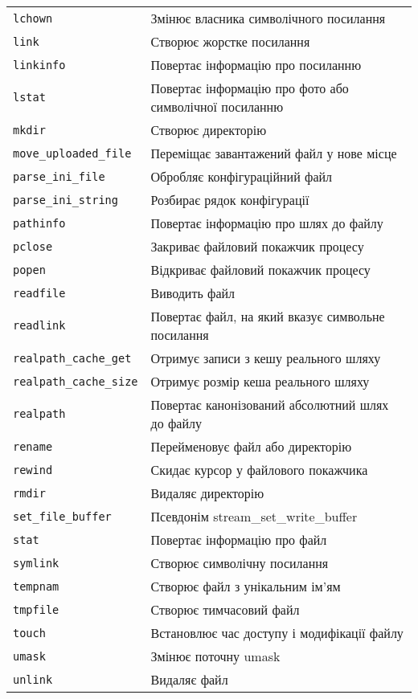 \begin{longtable}[t]{|l|p{20em}|}
\verb'lchown' & Змінює власника символічного посилання\\
\verb'link' & Створює жорстке посилання\\
\verb'linkinfo' & Повертає інформацію про посиланню\\
\verb'lstat' & Повертає інформацію про фото або символічної посиланню\\
\verb'mkdir' & Створює директорію\\
\verb'move_uploaded_file' & Переміщає завантажений файл у нове місце\\
\verb'parse_ini_file' & Обробляє конфігураційний файл\\
\verb'parse_ini_string' & Розбирає рядок конфігурації\\
\verb'pathinfo' & Повертає інформацію про шлях до файлу\\
\verb'pclose' & Закриває файловий покажчик процесу\\
\verb'popen' & Відкриває файловий покажчик процесу\\
\verb'readfile' & Виводить файл\\
\verb'readlink' & Повертає файл, на який вказує символьне посилання\\
\verb'realpath_cache_get' & Отримує записи з кешу реального шляху\\
\verb'realpath_cache_size' & Отримує розмір кеша реального шляху\\
\verb'realpath' & Повертає канонізований абсолютний шлях до файлу\\
\verb'rename' & Перейменовує файл або директорію\\
\verb'rewind' & Скидає курсор у файлового покажчика\\
\verb'rmdir' & Видаляє директорію\\
\verb'set_file_buffer' & Псевдонім stream\_set\_write\_buffer\\
\verb'stat' & Повертає інформацію про файл\\
\verb'symlink' & Створює символічну посилання\\
\verb'tempnam' & Створює файл з унікальним ім'ям\\
\verb'tmpfile' & Створює тимчасовий файл\\
\verb'touch' & Встановлює час доступу і модифікації файлу\\
\verb'umask' & Змінює поточну umask\\
\verb'unlink' & Видаляє файл \\


\hline
\end{longtable}



